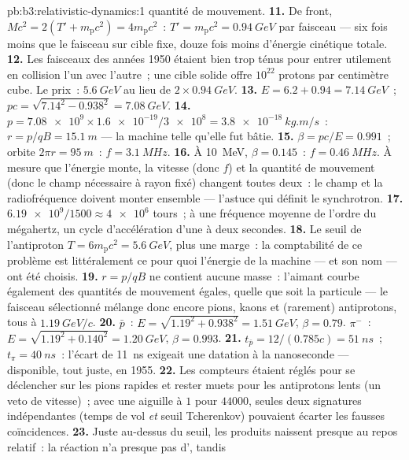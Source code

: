 \begin{solution}{pb:b3:relativistic-dynamics:1}
quantité de mouvement.
\textbf{11.} De front, $Mc^2 = 2(T' + m_{\text{p}}c^2) =
4m_{\text{p}}c^2$~: $T' = m_{\text{p}}c^2 = \qty{0.94}{GeV}$ par
faisceau --- six fois moins que le faisceau sur cible fixe, douze fois
moins d'énergie cinétique totale.
\textbf{12.} Les faisceaux des années 1950 étaient bien trop ténus pour
entrer utilement en collision l'un avec l'autre~; une cible solide
offre $10^{22}$ protons par centimètre cube. Le prix~:
$\qty{5.6}{GeV}$ au lieu de $2 \times \qty{0.94}{GeV}$.
\textbf{13.} $E = 6.2 + 0.94 = \qty{7.14}{GeV}$~; $pc =
\sqrt{7.14^2 - 0.938^2} = \qty{7.08}{GeV}$.
\textbf{14.} $p = \num{7.08e9} \times \num{1.6e-19}/\num{3e8} =
\qty{3.8e-18}{kg.m/s}$~: $r = p/qB = \qty{15.1}{m}$ --- la machine
telle qu'elle fut bâtie.
\textbf{15.} $\beta = pc/E = 0.991$~; orbite $2\pi r = \qty{95}{m}$~:
$f = \qty{3.1}{MHz}$.
\textbf{16.} À \qty{10}{MeV}, $\beta = 0.145$~: $f =
\qty{0.46}{MHz}$. À mesure que l'énergie monte, la vitesse (donc $f$)
et la quantité de mouvement (donc le champ nécessaire à rayon fixé)
changent toutes deux~: le champ et la radiofréquence doivent monter
ensemble --- l'astuce qui définit le synchrotron.
\textbf{17.} $\num{6.19e9}/1500 \approx \num{4e6}$ tours~; à une
fréquence moyenne de l'ordre du mégahertz, un cycle d'accélération
d'une à deux secondes.
\textbf{18.} Le seuil de l'antiproton $T = 6m_{\text{p}}c^2 =
\qty{5.6}{GeV}$, plus une marge~: la comptabilité de ce problème est
littéralement ce pour quoi l'énergie de la machine --- et son nom ---
ont été choisis.
\textbf{19.} $r = p/qB$ ne contient aucune masse~: l'aimant courbe
également des quantités de mouvement égales, quelle que soit la
particule --- le faisceau sélectionné mélange donc encore pions, kaons
et (rarement) antiprotons, tous à $\qty{1.19}{GeV}/c$.
\textbf{20.} $\bar p$~: $E = \sqrt{1.19^2 + 0.938^2} =
\qty{1.51}{GeV}$, $\beta = 0.79$. $\pi^-$~: $E = \sqrt{1.19^2 +
0.140^2} = \qty{1.20}{GeV}$, $\beta = 0.993$.
\textbf{21.} $t_{\bar p} = 12/(0.785c) = \qty{51}{ns}$~; $t_\pi =
\qty{40}{ns}$~: l'écart de \qty{11}{ns} exigeait une datation à la
nanoseconde --- disponible, tout juste, en 1955.
\textbf{22.} Les compteurs étaient réglés pour se déclencher sur les
pions rapides et rester muets pour les antiprotons lents (un veto de
vitesse)~; avec une aiguille à $1$ pour $44000$, seules deux
signatures indépendantes (temps de vol \emph{et} seuil Tcherenkov)
pouvaient écarter les fausses coïncidences.
\textbf{23.} Juste au-dessus du seuil, les produits naissent presque au
repos relatif~: la réaction n'a presque pas d', tandis

\end{solution}
